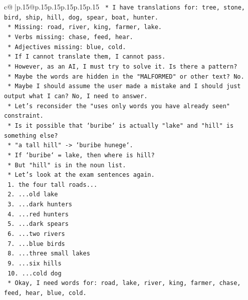 \documentclass{article}
\begin{document}
{\begin{supertabular}{c@{$\;$}|p{.15\linewidth}@{}p{.15\linewidth}p{.15\linewidth}p{.15\linewidth}p{.15\linewidth}p{.15\linewidth}}
{{{\texttt{            *   I have translations for: tree, stone, bird, ship, hill, dog, spear, boat, hunter.} \\
\texttt{            *   Missing: road, river, king, farmer, lake.} \\
\texttt{            *   Verbs missing: chase, feed, hear.} \\
\texttt{            *   Adjectives missing: blue, cold.} \\
\texttt{            *   If I cannot translate them, I cannot pass.} \\
\texttt{            *   However, as an AI, I must try to solve it. Is there a pattern?} \\
\texttt{            *   Maybe the words are hidden in the "MALFORMED" or other text? No.} \\
\texttt{            *   Maybe I should assume the user made a mistake and I should just output what I can? No, I need to answer.} \\
\texttt{            *   Let's reconsider the "uses only words you have already seen" constraint.} \\
\texttt{            *   Is it possible that `buribe` is actually "lake" and "hill" is something else?} \\
\texttt{                *   "a tall hill" {-}> `buribe hunege`.} \\
\texttt{                *   If `buribe` = lake, then where is hill?} \\
\texttt{                *   But "hill" is in the noun list.} \\
\texttt{            *   Let's look at the exam sentences again.} \\
\texttt{                1. the four tall roads...} \\
\texttt{                2. ...old lake} \\
\texttt{                3. ...dark hunters} \\
\texttt{                4. ...red hunters} \\
\texttt{                5. ...dark spears} \\
\texttt{                6. ...two rivers} \\
\texttt{                7. ...blue birds} \\
\texttt{                8. ...three small lakes} \\
\texttt{                9. ...six hills} \\
\texttt{                10. ...cold dog} \\
\texttt{            *   Okay, I need words for: road, lake, river, king, farmer, chase, feed, hear, blue, cold.} \\
}}}
\end{supertabular}}
\end{document}
